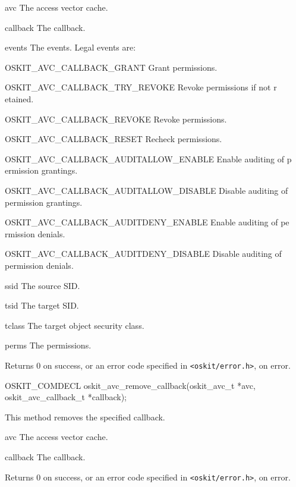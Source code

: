 \begin{apiparm}
        \item[avc]
                The access vector cache.
        \item[callback]
                The callback.
        \item[events]
                The events.
                Legal events are:
                \begin{icsymlist}
                \item[OSKIT_AVC_CALLBACK_GRANT] Grant permissions.
                \item[OSKIT_AVC_CALLBACK_TRY_REVOKE] Revoke permissions if not r
etained.
                \item[OSKIT_AVC_CALLBACK_REVOKE] Revoke permissions.
                \item[OSKIT_AVC_CALLBACK_RESET] Recheck permissions.
                \item[OSKIT_AVC_CALLBACK_AUDITALLOW_ENABLE] Enable auditing of p
ermission grantings.
                \item[OSKIT_AVC_CALLBACK_AUDITALLOW_DISABLE] Disable auditing of
 permission grantings.   
                \item[OSKIT_AVC_CALLBACK_AUDITDENY_ENABLE] Enable auditing of pe
rmission denials.
                \item[OSKIT_AVC_CALLBACK_AUDITDENY_DISABLE] Disable auditing of
permission denials.      
                \end{icsymlist} 
        \item[ssid]
                The source SID.
        \item[tsid]
                The target SID.
        \item[tclass]
                The target object security class.
        \item[perms] 
                The permissions.
\end{apiparm}
\begin{apiret}  
        Returns 0 on success, or an error code specified in
        {\tt <oskit/error.h>}, on error.
\end{apiret}


\begin{apisyn}
 
        \funcproto OSKIT_COMDECL
        oskit_avc_remove_callback(oskit_avc_t *avc,
                         oskit_avc_callback_t *callback);
\end{apisyn}
\begin{apidesc}
        This method removes the specified callback.
\end{apidesc}
\begin{apiparm}
        \item[avc]
                The access vector cache.
        \item[callback]
                The callback.
\end{apiparm}
\begin{apiret}
        Returns 0 on success, or an error code specified in
        {\tt <oskit/error.h>}, on error.
\end{apiret}


